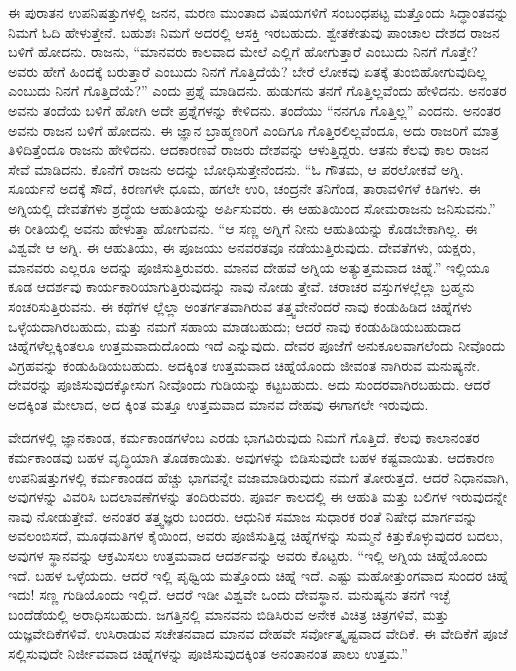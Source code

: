 ಈ ಪುರಾತನ ಉಪನಿಷತ್ತುಗಳಲ್ಲಿ ಜನನ, ಮರಣ ಮುಂತಾದ ವಿಷಯಗಳಿಗೆ ಸಂಬಂಧಪಟ್ಟ ಮತ್ತೊಂದು ಸಿದ್ಧಾಂತವನ್ನು ನಿಮಗೆ ಓದಿ ಹೇಳುತ್ತೇನೆ. ಬಹುಶಃ ನಿಮಗೆ ಅದರಲ್ಲಿ ಆಸಕ್ತಿ ಇರಬಹುದು. ಶ್ವೇತಕೇತುವು ಪಾಂಚಾಲ ದೇಶದ ರಾಜನ ಬಳಿಗೆ ಹೋದನು. ರಾಜನು, “ಮಾನವರು ಕಾಲವಾದ ಮೇಲೆ ಎಲ್ಲಿಗೆ ಹೋಗುತ್ತಾರೆ ಎಂಬುದು ನಿನಗೆ ಗೊತ್ತೇ? ಅವರು ಹೇಗೆ ಹಿಂದಕ್ಕೆ ಬರುತ್ತಾರೆ ಎಂಬುದು ನಿನಗೆ ಗೊತ್ತಿದೆಯೆ? ಬೇರೆ ಲೋಕವು ಏತಕ್ಕೆ ತುಂಬಿಹೋಗುವುದಿಲ್ಲ ಎಂಬುದು ನಿನಗೆ ಗೊತ್ತಿದೆಯೆ?” ಎಂದು ಪ್ರಶ್ನೆ ಮಾಡಿದನು. ಹುಡುಗನು ತನಗೆ ಗೊತ್ತಿಲ್ಲವೆಂದು ಹೇಳಿದನು. ಅನಂತರ ಅವನು ತಂದೆಯ ಬಳಿಗೆ ಹೋಗಿ ಅದೇ ಪ್ರಶ್ನೆಗಳನ್ನು ಕೇಳಿದನು. ತಂದೆಯು “ನನಗೂ ಗೊತ್ತಿಲ್ಲ” ಎಂದನು. ಅನಂತರ ಅವನು ರಾಜನ ಬಳಿಗೆ ಹೋದನು. ಈ ಜ್ಞಾನ ಬ್ರಾಹ್ಮಣರಿಗೆ ಎಂದಿಗೂ ಗೊತ್ತಿರಲಿಲ್ಲವೆಂದೂ, ಅದು ರಾಜರಿಗೆ ಮಾತ್ರ ತಿಳಿದಿತ್ತೆಂದೂ ರಾಜನು ಹೇಳಿದನು. ಆದಕಾರಣವೆ ರಾಜರು ದೇಶವನ್ನು ಆಳುತ್ತಿದ್ದರು. ಆತನು ಕೆಲವು ಕಾಲ ರಾಜನ ಸೇವೆ ಮಾಡಿದನು. ಕೊನೆಗೆ ರಾಜನು ಅದನ್ನು ಬೋಧಿಸುತ್ತೇನೆಂದನು. “ಓ ಗೌತಮ, ಆ ಪರಲೋಕವೆ ಅಗ್ನಿ. ಸೂರ್ಯನೆ ಅದಕ್ಕೆ ಸೌದೆ, ಕಿರಣಗಳೇ ಧೂಮ, ಹಗಲೇ ಉರಿ, ಚಂದ್ರನೇ ತನಿಗೆಂಡ, ತಾರಾವಳಿಗಳೆ ಕಿಡಿಗಳು. ಈ ಅಗ್ನಿಯಲ್ಲಿ ದೇವತೆಗಳು ಶ್ರದ್ಧೆಯ ಆಹುತಿಯನ್ನು ಅರ್ಪಿಸುವರು. ಈ ಆಹುತಿಯಿಂದ ಸೋಮರಾಜನು ಜನಿಸುವನು.” ಈ ರೀತಿಯಲ್ಲಿ ಅವನು ಹೇಳುತ್ತಾ ಹೋಗುವನು. “ಆ ಸಣ್ಣ ಅಗ್ನಿಗೆ ನೀನು ಆಹುತಿಯನ್ನು ಕೊಡಬೇಕಾಗಿಲ್ಲ. ಈ ವಿಶ್ವವೇ ಆ ಅಗ್ನಿ. ಈ ಆಹುತಿಯು, ಈ ಪೂಜಯು ಅನವರತವೂ ನಡೆಯುತ್ತಿರುವುದು. ದೇವತೆಗಳು, ಯಕ್ಷರು, ಮಾನವರು ಎಲ್ಲರೂ ಅದನ್ನು ಪೂಜಿಸುತ್ತಿರುವರು. ಮಾನವ ದೇಹವೆ ಅಗ್ನಿಯ ಅತ್ಯುತ್ತಮವಾದ ಚಿಹ್ನೆ.” ಇಲ್ಲಿಯೂ ಕೂಡ ಆದರ್ಶವು ಕಾರ್ಯಕಾರಿಯಾಗುತ್ತಿರುವುದನ್ನು ನಾವು ನೋಡು ತ್ತೇವೆ. ಚರಾಚರ ವಸ್ತುಗಳಲ್ಲೆಲ್ಲಾ ಬ್ರಹ್ಮನು ಸಂಚರಿಸುತ್ತಿರುವನು. ಈ ಕಥೆಗಳ ಲ್ಲೆಲ್ಲಾ ಅಂತರ್ಗತವಾಗಿರುವ ತತ್ತ್ವವೇನೆಂದರೆ ನಾವು ಕಂಡುಹಿಡಿದ ಚಿಹ್ನೆಗಳು ಒಳ್ಳೆಯದಾಗಿರಬಹುದು, ಮತ್ತು ನಮಗೆ ಸಹಾಯ ಮಾಡಬಹುದು; ಆದರೆ ನಾವು ಕಂಡುಹಿಡಿಯಬಹುದಾದ ಚಿಹ್ನೆಗಳೆಲ್ಲಕ್ಕಿಂತಲೂ ಉತ್ತಮವಾದುದೊಂದು ಇದೆ ಎನ್ನುವುದು. ದೇವರ ಪೂಜೆಗೆ ಅನುಕೂಲವಾಗಲೆಂದು ನೀವೊಂದು ವಿಗ್ರಹವನ್ನು ಕಂಡುಹಿಡಿಯಬಹುದು. ಅದಕ್ಕಿಂತ ಉತ್ತಮವಾದ ಚಿಹ್ನೆಯೊಂದು ಜೀವಂತ ನಾಗಿರುವ ಮನುಷ್ಯನೇ. ದೇವರನ್ನು ಪೂಜಿಸುವುದಕ್ಕೋಸುಗ ನೀವೊಂದು ಗುಡಿಯನ್ನು ಕಟ್ಟಬಹುದು. ಅದು ಸುಂದರವಾಗಿರಬಹುದು. ಆದರೆ ಅದಕ್ಕಿಂತ ಮೇಲಾದ, ಅದ ಕ್ಕಿಂತ ಮತ್ತೂ ಉತ್ತಮವಾದ ಮಾನವ ದೇಹವು ಈಗಾಗಲೇ ಇರುವುದು.

ವೇದಗಳಲ್ಲಿ ಜ್ಞಾನಕಾಂಡ, ಕರ್ಮಕಾಂಡಗಳೆಂಬ ಎರಡು ಭಾಗವಿರುವುದು ನಿಮಗೆ ಗೊತ್ತಿದೆ. ಕೆಲವು ಕಾಲಾನಂತರ ಕರ್ಮಕಾಂಡವು ಬಹಳ ವೃದ್ಧಿಯಾಗಿ ತೊಡಕಾಯಿತು. ಅವುಗಳನ್ನು ಬಿಡಿಸುವುದೇ ಬಹಳ ಕಷ್ಟವಾಯಿತು. ಆದಕಾರಣ ಉಪನಿಷತ್ತುಗಳಲ್ಲಿ ಕರ್ಮಕಾಂಡದ ಹೆಚ್ಚು ಭಾಗವನ್ನೇ ವಜಾಮಾಡಿರುವುದು ನಮಗೆ ತೋರುತ್ತದೆ. ಆದರೆ ನಿಧಾನವಾಗಿ, ಅವುಗಳನ್ನು ವಿವರಿಸಿ ಬದಲಾವಣೆಗಳನ್ನು ತಂದಿರುವರು. ಪೂರ್ವ ಕಾಲದಲ್ಲಿ ಈ ಆಹುತಿ ಮತ್ತು ಬಲಿಗಳ ಇರುವುದನ್ನೇ ನಾವು ನೋಡುತ್ತೇವೆ. ಅನಂತರ ತತ್ತ್ವಜ್ಞರು ಬಂದರು. ಆಧುನಿಕ ಸಮಾಜ ಸುಧಾರಕ ರಂತೆ ನಿಷೇಧ ಮಾರ್ಗವನ್ನು ಅವಲಂಬಿಸದೆ, ಮೂಢಮತಿಗಳ ಕೈಯಿಂದ, ಅವರು ಪೂಜಿಸುತ್ತಿದ್ದ ಚಿಹ್ನೆಗಳನ್ನು ಸುಮ್ಮನೆ ಕಿತ್ತುಕೊಳ್ಳುವುದರ ಬದಲು, ಅವುಗಳ ಸ್ಥಾನವನ್ನು ಆಕ್ರಮಿಸಲು ಉತ್ತಮವಾದ ಆದರ್ಶವನ್ನು ಅವರು ಕೊಟ್ಟರು. “ಇಲ್ಲಿ ಅಗ್ನಿಯ ಚಿಹ್ನೆಯೊಂದು ಇದೆ. ಬಹಳ ಒಳ್ಳೆಯದು. ಆದರೆ ಇಲ್ಲಿ ಪೃಥ್ವಿಯ ಮತ್ತೊಂದು ಚಿಹ್ನೆ ಇದೆ. ಎಷ್ಟು ಮಹೋತ್ತುಂಗವಾದ ಸುಂದರ ಚಿಹ್ನೆ ಇದು! ಸಣ್ಣ ಗುಡಿಯೊಂದು ಇಲ್ಲಿದೆ. ಆದರೆ ಇಡೀ ವಿಶ್ವವೇ ಒಂದು ದೇವಸ್ಥಾನ. ಮನುಷ್ಯನು ತನಗೆ ಇಚ್ಛೆ ಬಂದೆಡೆಯಲ್ಲಿ ಅರಾಧಿಸಬಹುದು. ಜಗತ್ತಿನಲ್ಲಿ ಮಾನವನು ಬಿಡಿಸಿರುವ ಅನೇಕ ವಿಚಿತ್ರ ಚಿತ್ರಗಳಿವೆ, ಮತ್ತು ಯಜ್ಞವೇದಿಕೆಗಳಿವೆ. ಉಸಿರಾಡುವ ಸಚೇತನವಾದ ಮಾನವ ದೇಹವೇ ಸರ್ವೋತ್ಕೃಷ್ಟವಾದ ವೇದಿಕೆ. ಈ ವೇದಿಕೆಗೆ ಪೂಜೆ ಸಲ್ಲಿಸುವುದೇ ನಿರ್ಜೀವವಾದ ಚಿಹ್ನೆಗಳನ್ನು ಪೂಜಿಸುವುದಕ್ಕಿಂತ ಅನಂತಾನಂತ ಪಾಲು ಉತ್ತಮ.”

